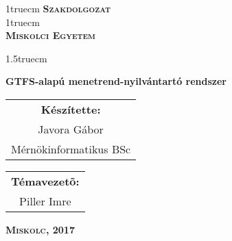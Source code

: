 \pagestyle{empty} %

{\large
\begin{center}
\vglue 1truecm
\textbf{\huge\textsc{Szakdolgozat}}\\
\vglue 1truecm
\\
\textbf{\textsc{Miskolci Egyetem}}
\end{center}}

\vglue 1.5truecm %

{\LARGE
\begin{center}
\textbf{GTFS-alapú menetrend-nyilvántartó rendszer}
\end{center}}

\vspace*{2.5truecm}
{\large
\begin{center}
\begin{tabular}{c}
\textbf{Készítette:}\\
Javora Gábor\\
Mérnökinformatikus BSc
\end{tabular}
\end{center}
\begin{center}
\begin{tabular}{c}
\textbf{Témavezetõ:}\\
Piller Imre
\end{tabular}
\end{center}}
\vfill
{\large
\begin{center}
\textbf{\textsc{Miskolc, 2017}}
\end{center}}

\newpage
